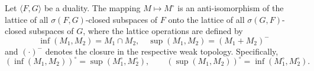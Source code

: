 Let $\langle F, G \rangle$ be a duality. The mapping $M \mapsto M^\circ$ is an anti-isomorphism of the lattice of all $\sigma(F, G)$-closed subspaces of $F$ onto the lattice of all $\sigma(G, F)$-closed subspaces of $G$, where the lattice operations are defined by
$$\inf(M_1, M_2) = M_1 \cap M_2, \quad \sup(M_1, M_2) = (M_1 + M_2)^-$$
and $(\cdot)^-$ denotes the closure in the respective weak topology. Specifically,
$$(\inf(M_1, M_2))^\circ = \sup(M_1^\circ, M_2^\circ), \qquad (\sup(M_1, M_2))^\circ = \inf(M_1^\circ, M_2^\circ).$$
